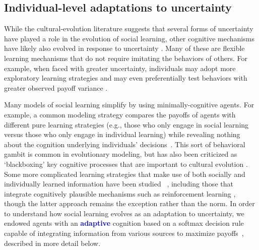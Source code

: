 \documentclass[letterpaper,11.5pt]{scrartcl}
\newcommand{\edit}[1]{{\bfseries \textcolor{blue} {#1}}}
\begin{document}


\subsection{Individual-level adaptations to uncertainty} 

While the cultural-evolution literature suggests that several forms of uncertainty have played a role in the evolution of social learning, other cognitive mechanisms have likely also evolved in response to uncertainty \citep{volz2012,johnson2013evolution,van2018uncertainty}. Many of these are flexible learning mechanisms that do not require imitating the behaviors of others. For example, when faced with greater uncertainty, individuals may adopt more exploratory learning strategies and may even preferentially test behaviors with greater observed payoff variance \citep{Wilson2014,Gershman2019}.

Many models of social learning simplify by using minimally-cognitive agents. For example, a common modeling strategy compares the payoffs of agents with different pure learning strategies (e.g., those who only engage in social learning versus those who only engage in individual learning) while revealing nothing about the cognition underlying individuals' decisions~\citep{BoydRicherson1985, Rogers1988, 
aoki2005}. This sort of behavioral gambit is common in evolutionary modeling, but has also been criticized as `blackboxing' key cognitive processes that are important to cultural evolution \citep{Heyes2016,Kendal2018}.  
Some more complicated learning strategies that make use of both socially and
individually learned information have been studied ~\citep{Enquist2007,
perreault2012bayesian}, including those that integrate cognitively plausible
mechanisms such as reinforcement learning \citep{lindstrom2016co}, though the latter
approach remains the exception rather than the norm. In order to understand how
social learning evolves as an adaptation to uncertainty, we endowed agents with an
\edit{adaptive} cognition based on a softmax decision rule capable of integrating information from various sources to maximize payoffs~\citep{Gershman2019}, described in more detail below. 
\end{document}
